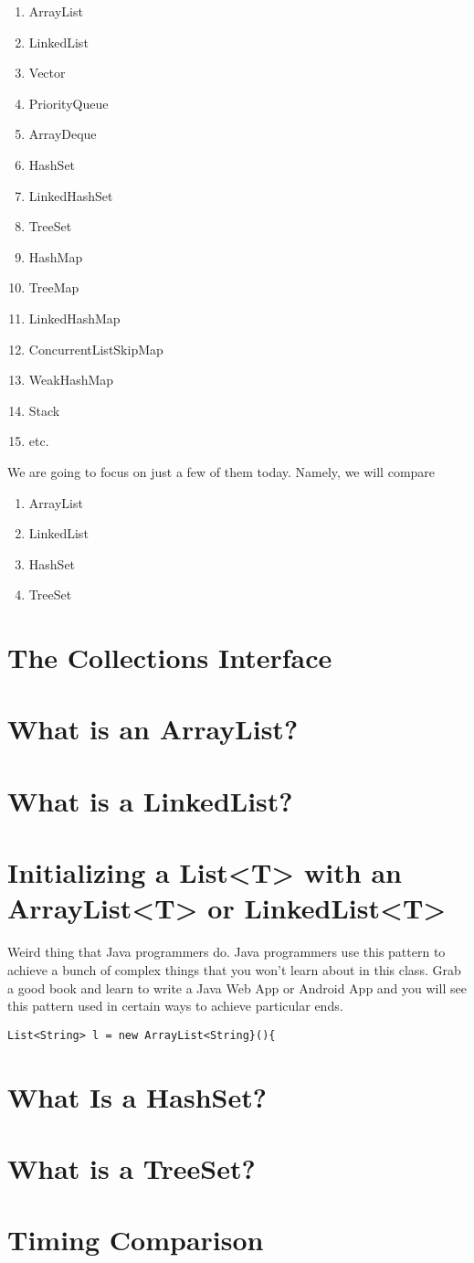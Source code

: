 \documentclass[12pt]{article}
\begin{document}
\begin{enumerate}
\item ArrayList
\item LinkedList
\item Vector
\item PriorityQueue
\item ArrayDeque
\item HashSet
\item LinkedHashSet
\item TreeSet
\item HashMap
\item TreeMap
\item LinkedHashMap
\item ConcurrentListSkipMap
\item WeakHashMap
\item Stack
\item etc.
\end{enumerate}

We are going to focus on just a few of them today. Namely, we will compare

\begin{enumerate}
\item ArrayList
\item LinkedList
\item HashSet
\item TreeSet
\end{enumerate}


\section{The Collections Interface}

\section{What is an ArrayList?}

\section{What is a LinkedList?}

\section{Initializing a List<T> with an ArrayList<T> or LinkedList<T>}
Weird thing that Java programmers do. Java programmers use this pattern to achieve a bunch of complex things that you won't learn about in this class. Grab a good book and learn to write a Java Web App or Android App and you will see this pattern used in certain ways to achieve particular ends.

\begin{lstlisting}
List<String> l = new ArrayList<String}(){
\end{lstlisting}

\section{What Is a HashSet?}

\section{What is a TreeSet?}


\section{Timing Comparison}
\end{document}
